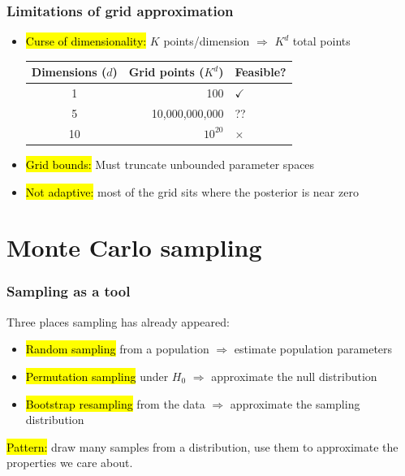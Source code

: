 \documentclass[slidestop,compress,mathserif]{beamer}
\begin{document}
\begin{frame}
\frametitle{Limitations of grid approximation}

\begin{itemize}
    \item \hl{Curse of dimensionality:} $K$ points/dimension $\Rightarrow$ $K^d$ total points

    \medskip
    \begin{center}
    \begin{tabular}{crl}
    \toprule
    \textbf{Dimensions ($d$)} & \textbf{Grid points ($K^d$)} & \textbf{Feasible?} \\
    \midrule
    1 & 100 & $\checkmark$ \\
    5 & 10,000,000,000 & ?? \\
    10 & $10^{20}$ & $\times$ \\
    \bottomrule
    \end{tabular}
    \end{center}
    \pause
    \medskip
    \item \hl{Grid bounds:} Must truncate unbounded parameter spaces
    \pause
    \item \hl{Not adaptive:} most of the grid sits where the posterior is near zero
    \pause
\end{itemize}
\end{frame}

\section{Monte Carlo sampling}

\begin{frame}
\frametitle{Sampling as a tool}

Three places sampling has already appeared:
\begin{itemize}
    \item \hl{Random sampling} from a population $\Rightarrow$ estimate population parameters
    \pause
    \item \hl{Permutation sampling} under $H_0$ $\Rightarrow$ approximate the null distribution
    \pause
    \item \hl{Bootstrap resampling} from the data $\Rightarrow$ approximate the sampling distribution
\end{itemize}

\pause
\medskip

\hl{Pattern:} draw many samples from a distribution, use them to approximate the properties we care about.

\pause
\medskip

\end{frame}
\end{document}
